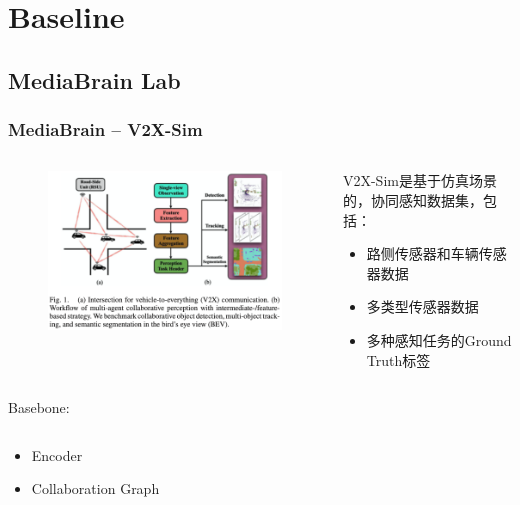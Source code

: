 \documentclass[8]{beamer}
\begin{document}
\section{Baseline}
\subsection{MediaBrain Lab}
\begin{frame}
    \frametitle{MediaBrain -- V2X-Sim\cite{Li_2021_RAL}}
    \begin{columns}
        \begin{column}{ 0.5\linewidth}
            \begin{figure}
                \includegraphics[width=\linewidth]{pic/V2XSim.png}
            \end{figure}
        \end{column}

        \begin{column}{0.5\linewidth}
            V2X-Sim是基于仿真场景的，协同感知数据集，包括：
            \begin{itemize}
                \item 路侧传感器和车辆传感器数据
                \item 多类型传感器数据
                \item 多种感知任务的Ground Truth标签
            \end{itemize}
        \end{column}
    \end{columns}
\bigskip
Basebone:
\begin{columns}
    \begin{column}{0.5\linewidth}
        \begin{itemize}
            \item Encoder
            \item Collaboration Graph
        \end{itemize}
    \end{column}


\end{columns}
\end{frame}
\end{document}
